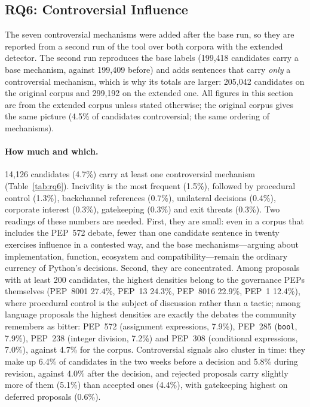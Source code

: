 \subsection{RQ6: Controversial Influence}
\label{sec:rq6}

The seven controversial mechanisms were added after the base run, so they are reported from a second run of the tool over both corpora with the extended detector. The second run reproduces the base labels (199,418 candidates carry a base mechanism, against 199,409 before) and adds sentences that carry \emph{only} a controversial mechanism, which is why its totals are larger: 205,042 candidates on the original corpus and 299,192 on the extended one. All figures in this section are from the extended corpus unless stated otherwise; the original corpus gives the same picture (4.5\% of candidates controversial; the same ordering of mechanisms).

\paragraph{How much and which.} 14,126 candidates (4.7\%) carry at least one controversial mechanism (Table~\ref{tab:rq6}). Incivility is the most frequent (1.5\%), followed by procedural control (1.3\%), backchannel references (0.7\%), unilateral decisions (0.4\%), corporate interest (0.3\%), gatekeeping (0.3\%) and exit threats (0.3\%). Two readings of these numbers are needed. First, they are small: even in a corpus that includes the PEP~572 debate, fewer than one candidate sentence in twenty exercises influence in a contested way, and the base mechanisms---arguing about implementation, function, ecosystem and compatibility---remain the ordinary currency of Python's decisions. Second, they are concentrated. Among proposals with at least 200 candidates, the highest densities belong to the governance PEPs themselves (PEP~8001 27.4\%, PEP~13 24.3\%, PEP~8016 22.9\%, PEP~1 12.4\%), where procedural control is the subject of discussion rather than a tactic; among language proposals the highest densities are exactly the debates the community remembers as bitter: PEP~572 (assignment expressions, 7.9\%), PEP~285 (\texttt{bool}, 7.9\%), PEP~238 (integer division, 7.2\%) and PEP~308 (conditional expressions, 7.0\%), against 4.7\% for the corpus. Controversial signals also cluster in time: they make up 6.4\% of candidates in the two weeks before a decision and 5.8\% during revision, against 4.0\% after the decision, and rejected proposals carry slightly more of them (5.1\%) than accepted ones (4.4\%), with gatekeeping highest on deferred proposals (0.6\%).

